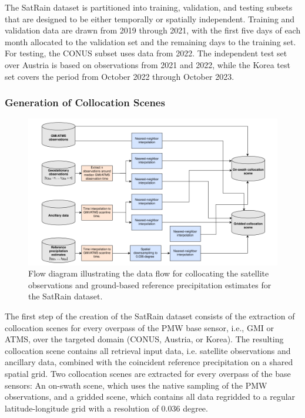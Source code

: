 \documentclass[11pt]{article}
\begin{document}
The SatRain dataset is partitioned into training, validation, and testing
subsets that are designed to be either temporally or spatially independent.
Training and validation data are drawn from 2019 through 2021, with the first
five days of each month allocated to the validation set and the remaining days
to the training set. For testing, the CONUS subset uses data from 2022. The
independent test set over Austria is based on observations from 2021 and 2022,
while the Korea test set covers the period from October 2022 through October
2023.

\subsubsection{Generation of Collocation Scenes}

\begin{figure}[htbp]
	\centering
	\includegraphics[width=1.0\textwidth]{figures/fig07}
	\caption{
		Flow diagram illustrating the data flow for collocating the satellite
		observations and ground-based reference precipitation estimates for the SatRain
		dataset.
	}
	\label{fig:data_flow}
\end{figure}

The first step of the creation of the SatRain dataset consists of the extraction
of collocation scenes for every overpass of the PMW base sensor, i.e., GMI or
ATMS, over the targeted domain (CONUS, Austria, or Korea). The resulting
collocation scene contains all retrieval input data, i.e. satellite observations
and ancillary data, combined with the coincident reference precipitation on a
shared spatial grid. Two collocation scenes are extracted for every overpass of
the base sensors: An on-swath scene, which uses the native sampling of the PMW
observations, and a gridded scene, which contains all data regridded to a
regular latitude-longitude grid with a resolution of 0.036 degree.
\end{document}
